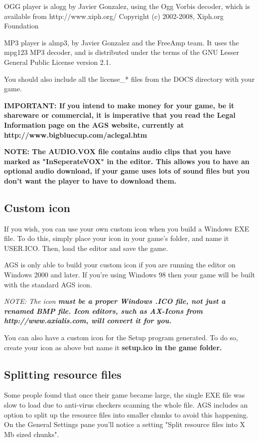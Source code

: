 OGG player is alogg by Javier Gonzalez, using the Ogg Vorbis decoder, which is available
from http://www.xiph.org/  Copyright (c) 2002-2008, Xiph.org Foundation

MP3 player is almp3, by Javier Gonzalez and the FreeAmp team. It uses the mpg123 MP3 decoder,
and is distributed under the terms of the GNU Lesser General Public License version 2.1.

You should also include all the license_* files from the DOCS directory with your game.

\bf{IMPORTANT:} If you intend to make money for your game, be it shareware or commercial,
it is imperative that you read the Legal Information page on the AGS website, currently
at http://www.bigbluecup.com/aclegal.htm

\bf{NOTE:} The AUDIO.VOX file contains audio clips that you have marked as "InSeperateVOX"
in the editor. This allows you to have an optional audio download, if your game uses lots
of sound files but you don't want the player to have to download them.


\subsection{Custom icon}%

If you wish, you can use your own custom icon when you build a Windows EXE
file. To do this, simply place your icon in your game's folder, and name
it USER.ICO. Then, load the editor and save the game.

AGS is only able to build your custom icon if you are running the editor on
Windows 2000 and later. If you're using Windows 98 then your game will be
built with the standard AGS icon.

\it{NOTE: The icon \bf{must} be a proper Windows .ICO file, \bf{not} just a renamed
BMP file. Icon editors, such as AX-Icons from http://www.axialis.com, will convert
it for you.}

You can also have a custom icon for the Setup program generated. To do so, create
your icon as above but name it \bf{setup.ico} in the game folder.

\subsection{Splitting resource files}\label{SplitRes}%

Some people found that once their game became large, the single EXE file
was slow to load due to anti-virus checkers scanning the whole file.
AGS includes an option to split up the resource files into smaller chunks
to avoid this happening. On the General Settings pane you'll notice a
setting "Split resource files into X Mb sized chunks".

